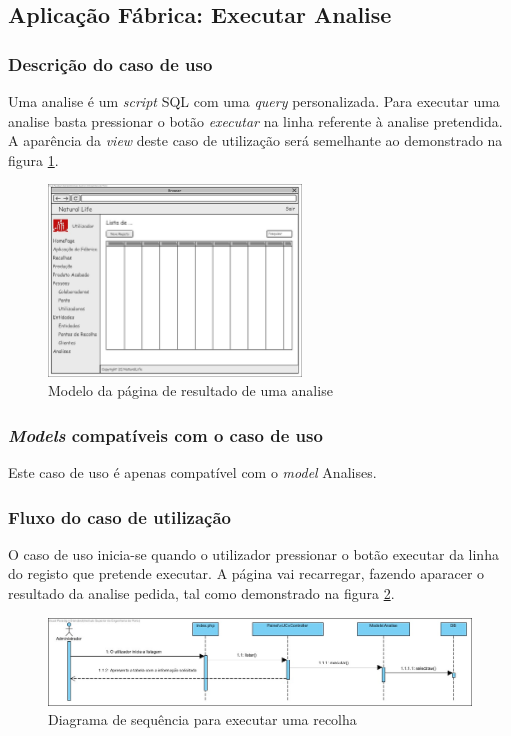 \subsection{Aplicação Fábrica: Executar Analise}
\subsubsection*{Descrição do caso de uso}
Uma analise é um \textit{script} SQL com uma \textit{query} personalizada. Para executar uma analise basta pressionar o botão \textit{executar} na linha referente à analise pretendida. A aparência da \textit{view} deste caso de utilização será semelhante ao demonstrado na figura \ref{fig:di_analise}.

\begin{figure}[H] 
	\begin{center}
		\includegraphics[width=0.60\textwidth,keepaspectratio]{figuras/Diagramas_vp/DI_Painel_1_Lista.jpg}
		\caption{Modelo da página de resultado de uma analise}
		\label{fig:di_analise} 
	\end{center}
\end{figure}

\subsubsection*{\textit{Models} compatíveis com o caso de uso}
Este caso de uso é apenas compatível com o \textit{model} Analises.

\subsubsection*{Fluxo do caso de utilização}
O caso de uso inicia-se quando o utilizador pressionar o botão executar da linha do registo que pretende executar. A página vai recarregar, fazendo aparacer o resultado da analise pedida, tal como demonstrado na figura \ref{fig:sd_executar analise}.


\begin{figure}[H] 
	\begin{center}
		\includegraphics[width=\textwidth,keepaspectratio]{figuras/Diagramas_vp/SD_Painel_7_Executar_Analise.jpg}
		\caption{Diagrama de sequência para executar uma recolha}
		\label{fig:sd_executar analise} 
	\end{center}
\end{figure}